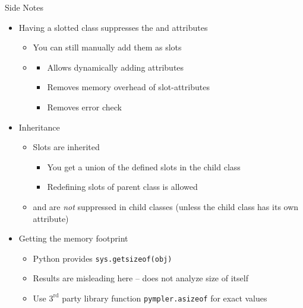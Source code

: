 
\begin{frame}{Side Notes}
%
\begin{itemize}
\item Having a slotted class suppresses the  and  attributes
	\begin{itemize}
	\item You can still manually add them as slots
	\item {}
		\begin{itemize}
		\item Allows dynamically adding attributes
		\item Removes memory overhead of slot-attributes
		\item Removes error check
		\end{itemize}
	\end{itemize}
\item Inheritance
	\begin{itemize}
	\item Slots are inherited
		\begin{itemize}
		\item You get a union of the defined slots in the child class
		\item Redefining slots of parent class is allowed
		\end{itemize}
	\item {} and  are \emph{not} suppressed in child classes (unless the child class has its own  attribute)
	\end{itemize}
\item Getting the memory footprint
	\begin{itemize}
	\item Python provides \texttt{sys.getsizeof(obj)}
	\item Results are misleading here -- does not analyze size of  itself
	\item Use $3^{\text{rd}}$ party library function \texttt{pympler.asizeof} for exact values
	\end{itemize}
\end{itemize}
%
\end{frame}


